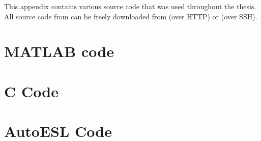 This appendix contains various source code that was used throughout the thesis.
All source code from can be freely downloaded from \gitRepoHTTP{} (over HTTP) or
\gitRepoSSH{} (over SSH).

\section{MATLAB code}
\label{sourceCode:matlab}


\section{C Code}
\label{sourceCode:c}


\section{AutoESL Code}
\label{sourceCode:autoesl}


